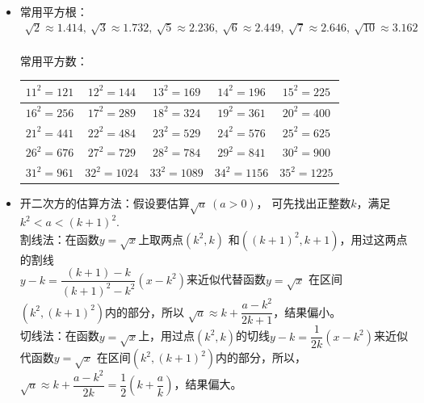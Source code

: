 \begin{itemize}[leftmargin=\inteval{\myitemleftmargin}pt,itemsep=
   \inteval{\myitemitempsep}pt,topsep=\inteval{\myitemtopsep}pt]
\item 常用平方根：
\begin{gather*}
    \sqrt{2}\approx1.414,\ \sqrt{3}\approx1.732,\ \sqrt{5}\approx2.236,\ 
    \sqrt{6}\approx2.449,\ \sqrt{7}\approx2.646,\ \sqrt{10}\approx3.162
\end{gather*}
\\
常用平方数：
\begin{table}[H]
    \centering
    \begin{tabular}{|c|c|c|c|c|}
        \hline
        $ 11^2=121 $ & $ 12^2=144 $ & $ 13^2=169 $ & $ 14^2=196 $ & $ 15^2=225 $\\ \hline
        $ 16^2=256 $ & $ 17^2=289 $ & $ 18^2=324 $ & $ 19^2=361 $ & $ 20^2=400 $\\ \hline
        $ 21^2=441 $ & $ 22^2=484 $ & $ 23^2=529 $ & $ 24^2=576 $ & $ 25^2=625 $\\ \hline
        $ 26^2=676 $ & $ 27^2=729 $ & $ 28^2=784 $ & $ 29^2=841 $ & $ 30^2=900 $\\ \hline
        $ 31^2=961 $ & $ 32^2=1024 $ & $ 33^2=1089 $ & $ 34^2=1156 $ & $ 35^2=1225 $\\ \hline
    \end{tabular}
\end{table}
\bigskip 
\item 开二次方的估算方法：假设要估算$ \sqrt{a}\ (a>0) $，
可先找出正整数$ k $，满足$ k^2<a<(k+1)^2 $. \\
割线法：在函数$ y=\sqrt{x} $上取两点$ (k^2,k) $
和$ ((k+1)^2,k+1) $，用过这两点的割线\\ $ y-k=\dfrac{
    (k+1)-k}{(k+1)^2-k^2}(x-k^2) $来近似代替函数$ y=\sqrt{x} $
在区间$ (k^2,(k+1)^2) $内的部分，所以
$ \sqrt{a}\approx k+\dfrac{a-k^2}{2k+1} $，结果偏小。 \\
切线法：在函数$ y=\sqrt{x} $上，用过点$ (k^2,k) $的切线$ y-k=\dfrac{1}{2k}(x-k^2) $来近似代函数$ y=\sqrt{x} $
在区间$ (k^2,(k+1)^2) $内的部分，所以，
$ 	\sqrt{a} \approx k+\dfrac{a-k^2}{2k}=
\dfrac{1}{2}\left(k+\dfrac{a}{k}\right) $，结果偏大。 


\end{itemize}

